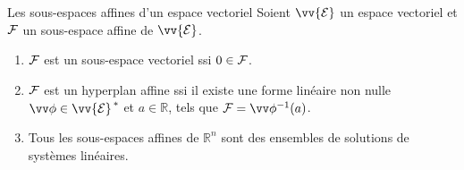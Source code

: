 \documentclass[
bigger]{m53beamer}
\begin{document}
  \begin{frame}{Les sous-espaces affines d'un espace vectoriel}
    Soient $\vv{\ens{E}}$ un espace vectoriel et $\mathcal{F}$ un sous-espace affine de $\vv{\ens{E}}$.
    \begin{enumerate}[<+(1)->]
      \item $\mathcal{F}$ est un sous-espace vectoriel ssi $0 \in \mathcal{F}$.
      \item $\mathcal{F}$ est un hyperplan affine ssi il existe une forme linéaire non nulle $\vv\phi\in\vv{\ens{E}}^{\,*}$ et $a \in \mathbb{R}$, tels que $\ens{F}=\vv\phi^{-1}(a)$.
      \item Tous les sous-espaces affines de $\mathbb{R}^{n}$ sont des ensembles de solutions de systèmes linéaires.
    \end{enumerate}
  \end{frame}
\end{document}
